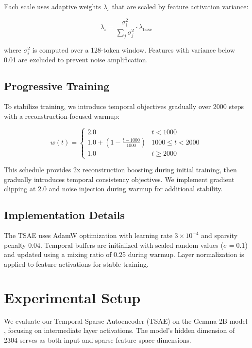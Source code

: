 \documentclass{article} %
\begin{document}
Each scale uses adaptive weights $\lambda_s$ that are scaled by feature activation variance:

\begin{equation}
\lambda_i = \frac{\sigma_i^2}{\sum_j \sigma_j^2} \cdot \lambda_{\text{base}}
\end{equation}

where $\sigma_i^2$ is computed over a 128-token window. Features with variance below 0.01 are excluded to prevent noise amplification.

\subsection{Progressive Training}
To stabilize training, we introduce temporal objectives gradually over 2000 steps with a reconstruction-focused warmup:

\begin{equation}
w(t) = \begin{cases}
2.0 & t < 1000 \\
1.0 + (1 - \frac{t-1000}{1000}) & 1000 \leq t < 2000 \\
1.0 & t \geq 2000
\end{cases}
\end{equation}

This schedule provides 2x reconstruction boosting during initial training, then gradually introduces temporal consistency objectives. We implement gradient clipping at 2.0 and noise injection during warmup for additional stability.

\subsection{Implementation Details}
The TSAE uses AdamW optimization \cite{loshchilov2017adamw} with learning rate $3\times10^{-4}$ and sparsity penalty 0.04. Temporal buffers are initialized with scaled random values ($\sigma=0.1$) and updated using a mixing ratio of 0.25 during warmup. Layer normalization \cite{ba2016layer} is applied to feature activations for stable training.

\section{Experimental Setup}
\label{sec:experimental}

We evaluate our Temporal Sparse Autoencoder (TSAE) on the Gemma-2B model \cite{radford2019language}, focusing on intermediate layer activations. The model's hidden dimension of 2304 serves as both input and sparse feature space dimensions.
\end{document}
